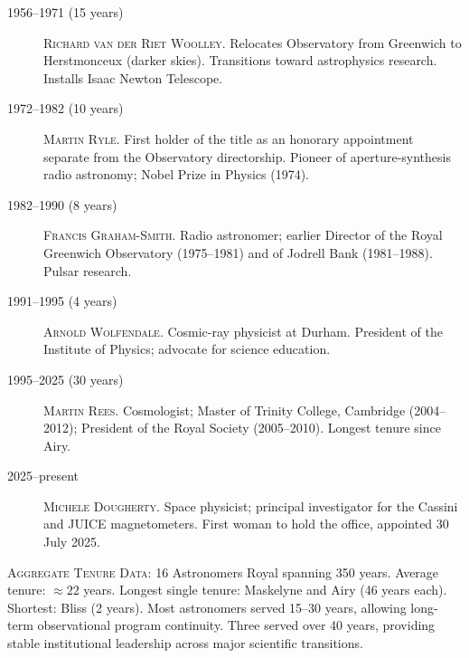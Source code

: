\begin{description}
\item[1956--1971 (15 years)] \textsc{Richard van der Riet Woolley}. Relocates Observatory from Greenwich to Herstmonceux (darker skies). Transitions toward astrophysics research. Installs Isaac Newton Telescope.

\item[1972--1982 (10 years)] \textsc{Martin Ryle}. First holder of the title as an honorary appointment separate from the Observatory directorship. Pioneer of aperture-synthesis radio astronomy; Nobel Prize in Physics (1974).

\item[1982--1990 (8 years)] \textsc{Francis Graham-Smith}. Radio astronomer; earlier Director of the Royal Greenwich Observatory (1975--1981) and of Jodrell Bank (1981--1988). Pulsar research.

\item[1991--1995 (4 years)] \textsc{Arnold Wolfendale}. Cosmic-ray physicist at Durham. President of the Institute of Physics; advocate for science education.

\item[1995--2025 (30 years)] \textsc{Martin Rees}. Cosmologist; Master of Trinity College, Cambridge (2004--2012); President of the Royal Society (2005--2010). Longest tenure since Airy.

\item[2025--present] \textsc{Michele Dougherty}. Space physicist; principal investigator for the Cassini and JUICE magnetometers. First woman to hold the office, appointed 30 July 2025.

\end{description}

\noindent\textsc{Aggregate Tenure Data}: 16 Astronomers Royal spanning 350 years. Average tenure: $\approx 22$ years. Longest single tenure: Maskelyne and Airy (46 years each). Shortest: Bliss (2 years). Most astronomers served 15--30 years, allowing long-term observational program continuity. Three served over 40 years, providing stable institutional leadership across major scientific transitions.